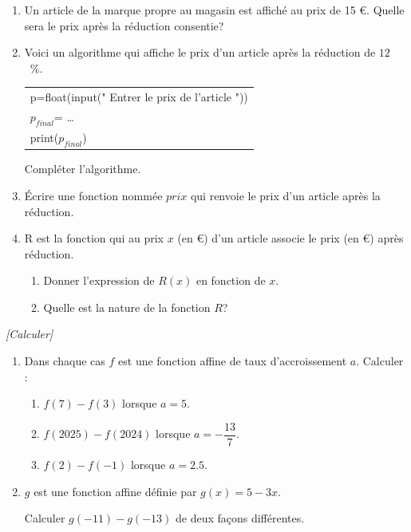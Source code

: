 \begin{enumerate}
\item Un article de la marque propre au magasin est affiché au prix de 15 \euro. Quelle sera le prix après la réduction consentie?
\item Voici un algorithme qui affiche le prix d'un article après la réduction de $12$~\%.

\begin{tabular}{|p{10cm}}
p=float(input(" Entrer le prix de l'article "))\\
$p_{final}$= \ldots  \\
print($p_{final}$)\\
\end{tabular}

\medskip

Compléter l'algorithme.

\item Écrire une fonction nommée \og $prix$ \fg{}  qui renvoie le prix d'un article après la réduction.

\item R est la fonction qui au prix $x$ (en \euro) d'un article associe le prix (en \euro) après réduction.

\begin{enumerate}[label=\alph*)]
\item Donner l'expression de $R(x)$ en fonction de $x$.
\item Quelle est la nature de la fonction $R$?
\end{enumerate}
\end{enumerate}

\exo \textit{[Calculer]}

\begin{enumerate}
\item Dans chaque cas $f$ est une fonction affine de taux d'accroissement $a$. Calculer :

\begin{enumerate}[label=\alph*)]
\item $f(7)-f(3)$ lorsque $a=5$. 
\item $f(2025)-f(2024)$ lorsque $a=-\dfrac{13}{7}$.
\item $f(2)-f(-1)$ lorsque $a=2.5$.
\end{enumerate}

\item $g$ est une fonction affine définie par $g(x)=5-3x$.

Calculer $g(-11)-g(-13)$ de deux façons différentes.
\end{enumerate}


